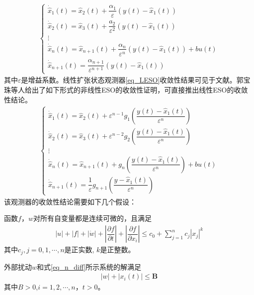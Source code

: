\begin{align}\left\{\begin{array}{l}
\dot{\hat{x}}_{1}(t)=\hat{x}_{2}(t)+\dfrac{\alpha_{1}}{\varepsilon}\left(y(t)-\hat{x}_{1}(t)\right) \\
\dot{\hat{x}}_{2}(t)=\hat{x}_{3}(t)+\dfrac{a_{2}}{\varepsilon^{2}}\left(y(t)-\hat{x}_{1}(t)\right) \\
\vdots \\
\dot{\hat{x}}_{n}(t)=\hat{x}_{n+1}(t)+\dfrac{\alpha_{n}}{\varepsilon^{n}}\left(y(t)-\hat{x}_{1}(t)\right)+bu(t) \\
\dot{\hat{x}}_{n+1}(t)=\dfrac{\alpha_{n+1}}{\varepsilon^{n+1}}\left(y(t)-\hat{x}_{1}(t)\right)	
\end{array}\right.	\label{eq_LESO}
\end{align}
其中$\varepsilon$是增益系数。线性扩张状态观测器\eqref{eq_LESO}收敛性结果可见于文献\parencite{Zheng_2007}。郭宝珠等人给出了如下形式的非线性ESO的收敛性证明\cite{Guo_2012,Guo_2011}，可直接推出线性ESO的收敛性结论。
\begin{align}\left\{\begin{array}{l}
\dot{\hat{x}}_{1}(t)=\hat{x}_{2}(t)+\varepsilon^{n-1} g_{1}\left(\dfrac{y(t)-\hat{x}_{1}(t)}{\varepsilon^{n}}\right) \\[5mm]
\dot{\hat{x}}_{2}(t)=\hat{x}_{3}(t)+\varepsilon^{n-2} g_{2}\left(\dfrac{y(t)-\hat{x}_{1}(t)}{\varepsilon^{n}}\right) \\[5mm]
\vdots \\
\dot{\hat{x}}_{n}(t)=\hat{x}_{n+1}(t)+g_{n}\left(\dfrac{y(t)-\hat{x}_{1}(t)}{\varepsilon^{n}}\right)+bu(t) \\[5mm]
\dot{\hat{x}}_{n+1}(t)=\dfrac{1}{\varepsilon} g_{n+1}\left(\dfrac{y-\hat{x}_{1}(t)}{\varepsilon^{n}}\right)
\end{array}\right.  	\label{eq_NLESO}
\end{align}
该观测器的收敛性结论需要如下几个假设：
\begin{assumption}
函数$ f $，$ w $对所有自变量都是连续可微的，且满足
\begin{align}|u|+|f|+|\dot{w}|+\left|\dfrac{\partial f}{\partial t}\right|+\left|\dfrac{\partial f}{\partial x_{i}}\right| \leq c_{0}+\sum_{j=1}^{n} c_{j}\left|x_{j}\right|^{k}\end{align}
其中$c_{j}, j=0,1, \cdots, n$是正实数, $ k $是正整数。	\label{H1}
\end{assumption}	
\begin{assumption}
外部扰动$w$和式\eqref{eq_n_diff}所示系统的解满足
\begin{align}
|w|+\left|x_{i}(t)\right| \leq \bm{B}
\end{align}
其中$ B>0 $,$ i=1,2,\cdots,n $，$ t>0 $。	\label{H2}
\end{assumption}
